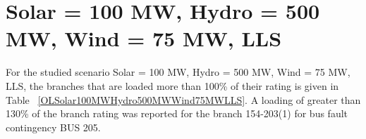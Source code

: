 \documentclass[10pt]{report}
\begin{document}
\section{Solar = 100 MW, Hydro = 500 MW, Wind = 75 MW, LLS}
For the studied scenario Solar = 100 MW, Hydro = 500 MW, Wind = 75 MW, LLS, the branches that are loaded more than 100\% of their rating is given in Table ~\ref{OLSolar100MWHydro500MWWind75MWLLS}. A loading of greater than 130\% of the branch rating was reported for the branch 154-203(1) for bus fault contingency BUS 205.
\begin{table}[H]
\caption{Contingencies causing branch flow greater than 100\% for scenario Solar = 100 MW, Hydro = 500 MW, Wind = 75 MW, LLS}
\label{OLSolar100MWHydro500MWWind75MWLLS}
\centering
{}
\end{table}
\end{document}
